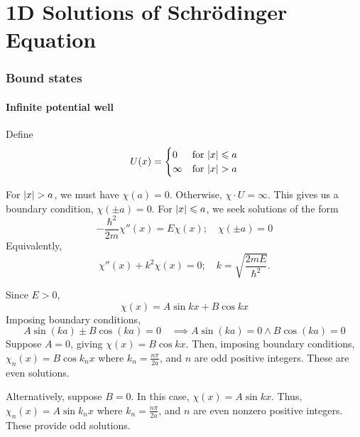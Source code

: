 \documentclass[a4paper]{article}
\begin{document}
\part{1D Solutions of Schr\"odinger Equation}
\section{Bound states}
\subsection{Infinite potential well}
\begin{example}
    Define
\[
	U(x) = \begin{cases}
		0      & \text{for } \abs{x} \leqslant a \\
		\infty & \text{for } \abs{x} > a
	\end{cases}
\]

\begin{center}
\end{center}

For \( \abs{x} > a \), we must have \( \chi(a) = 0 \).
Otherwise, \( \chi \cdot U = \infty \).
This gives us a boundary condition, \( \chi(\pm a) = 0 \).
For \( \abs{x} \leqslant a \), we seek solutions of the form
\[
	-\frac{\hbar^2}{2m} \chi''(x) = E \chi(x);\quad \chi(\pm a) = 0
\]
Equivalently,
\[
	\chi''(x) + k^2 \chi(x) = 0;\quad k = \sqrt{\frac{2mE}{\hbar^2}}. 
\]
\end{example}
Since \( E > 0 \),
\[
	\chi(x) = A \sin kx + B \cos kx
\]
Imposing boundary conditions,
\[
	A \sin (k a) \pm B \cos (k a)=0 \quad \implies A \sin (k a)=0 \wedge B \cos (k a)=0
\]
Suppose \( A = 0 \), giving \( \chi(x) = B \cos kx \).
Then, imposing boundary conditions, \( \chi_n(x) = B \cos k_n x \) where \( k_n = \frac{n \pi}{2a} \), and \( n \) are odd positive integers.
These are even solutions.

Alternatively, suppose \( B = 0 \).
In this case, \( \chi(x) = A \sin kx \).
Thus, \( \chi_n(x) = A \sin k_n x \) where \( k_n = \frac{n \pi}{2a} \), and \( n \) are even nonzero positive integers.
These provide odd solutions.
\end{document}

